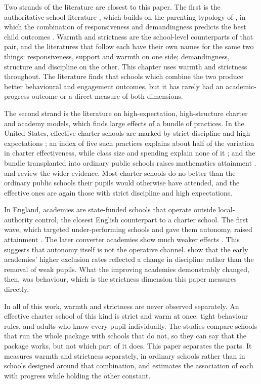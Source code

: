 Two strands of the literature are closest to this paper. The first is the
authoritative-school literature \citep{pellerin2005,gregory2010}, which
builds on the parenting typology of \citet{maccoby1983}, in which the combination of responsiveness and demandingness predicts the best child outcomes \citep{majumder2015,zhang2017}. Warmth and strictness are the school-level counterparts of that pair, and the literatures that follow each have their own names for the same two things: responsiveness, support and warmth on one side; demandingness, structure and discipline on the other. This chapter uses warmth and strictness throughout. The literature finds that schools which combine the two produce better behavioural and engagement outcomes, but it has rarely had an academic-progress outcome or a direct measure of both dimensions.

The second strand is the literature on high-expectation, high-structure charter and academy models, which finds
large effects of a bundle of practices. In the United States, effective
charter schools are marked by strict discipline and high expectations
\citep{abdulkadiroglu2011,angrist2010}; an index of five such practices
explains about half of the variation in charter effectiveness, while class
size and spending explain none of it \citep{dobbie2013}; and the bundle
transplanted into ordinary public schools raises mathematics attainment
\citep{fryer2014}. \citet{chabrier2016} and \citet{epple2016} review the wider evidence. Most charter schools do no better than the ordinary public schools their pupils would otherwise have attended, and the effective ones are again those with strict discipline and high expectations.

In England, academies are state-funded schools that operate outside local-authority control, the closest English counterpart to a charter school. The first wave, which targeted under-performing schools and gave them autonomy, raised attainment \citep{machin2011,eyles2016}. The later converter academies show much weaker effects \citep{eyles2018}. This suggests that
autonomy itself is not the operative channel. \citet{machin2020} show that the early academies' higher exclusion rates reflected a change in discipline rather than the removal of weak pupils. What the improving academies demonstrably changed, then, was behaviour, which is the strictness dimension this paper measures directly.

In all of this work, warmth and strictness are never observed separately. An effective charter school of this kind is strict and warm at once: tight behaviour rules, and adults who know every pupil individually. The studies compare schools that run the whole package with schools that do not, so they can say that the package works, but not which part of it does. This paper separates the parts. It measures warmth and strictness separately, in ordinary schools rather than in schools designed around that combination, and estimates the association of each with progress while holding the other constant.

